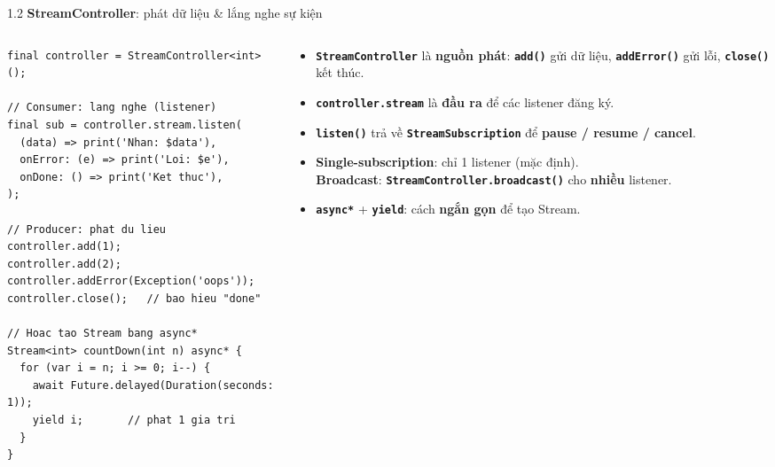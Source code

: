 \documentclass[aspectratio=169,10pt]{beamer}
\newcommand{\api}[1]{\texttt{\bfseries #1}}   %
\begin{document}
\begin{frame}[fragile]{1.2 \textbf{StreamController}: phát dữ liệu \& lắng nghe sự kiện}
  \begin{columns}[T]
    \begin{column}{0.54\textwidth}
\begin{lstlisting}
final controller = StreamController<int>();

// Consumer: lang nghe (listener)
final sub = controller.stream.listen(
  (data) => print('Nhan: $data'),
  onError: (e) => print('Loi: $e'),
  onDone: () => print('Ket thuc'),
);

// Producer: phat du lieu
controller.add(1);
controller.add(2);
controller.addError(Exception('oops'));
controller.close();   // bao hieu "done"

// Hoac tao Stream bang async*
Stream<int> countDown(int n) async* {
  for (var i = n; i >= 0; i--) {
    await Future.delayed(Duration(seconds: 1));
    yield i;       // phat 1 gia tri
  }
}
\end{lstlisting}
    \end{column}
    \begin{column}{0.44\textwidth}
      \small
      \begin{itemize}\itemsep4pt
        \item \api{StreamController} là \textbf{nguồn phát}: \api{add()} gửi dữ liệu, \api{addError()} gửi lỗi, \api{close()} kết thúc.
        \item \api{controller.stream} là \textbf{đầu ra} để các listener đăng ký.
        \item \api{listen()} trả về \api{StreamSubscription} để \textbf{pause / resume / cancel}.
        \item \textbf{Single-subscription}: chỉ 1 listener (mặc định). \\ \textbf{Broadcast}: \api{StreamController.broadcast()} cho \textbf{nhiều} listener.
        \item \api{async*} + \api{yield}: cách \textbf{ngắn gọn} để tạo Stream.
      \end{itemize}
    \end{column}
  \end{columns}
\end{frame}
\end{document}
